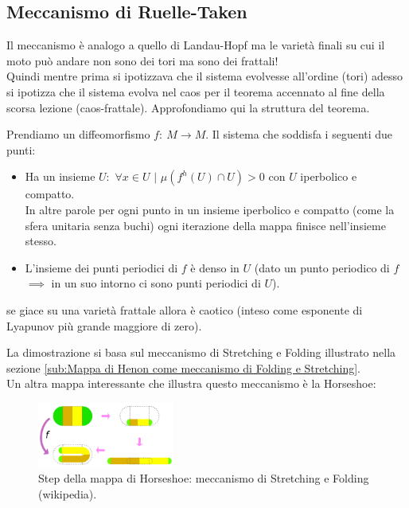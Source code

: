 \subsection{Meccanismo di Ruelle-Taken}%
\label{sub:Meccanismo di Ruelle-Taken}
Il meccanismo è analogo a quello di Landau-Hopf ma le varietà finali su cui il moto può andare non sono dei tori ma sono dei frattali!\\
Quindi mentre prima si ipotizzava che il sistema evolvesse all'ordine (tori) adesso si ipotizza che il sistema evolva nel caos per il teorema accennato al fine della scorsa lezione (caos-frattale). Approfondiamo qui la struttura del teorema.
\begin{thm}[Axiom A]
    Prendiamo un diffeomorfismo $f: \ M\to M$. Il sistema che soddisfa i seguenti due punti:
    \begin{itemize}
	\item Ha un insieme $U:$ $\forall x \in U$ $|$ $\mu (f^h(U) \cap U) > 0 $ con $U$ iperbolico e compatto.\\
	    In altre parole per ogni punto in un insieme iperbolico e compatto (come la sfera unitaria senza buchi) ogni iterazione della mappa finisce nell'insieme stesso.
	\item L'insieme dei punti periodici di $f$ è denso in $U$ (dato un punto periodico di $f$ $\implies$ in un suo intorno ci sono punti periodici di $U$).
    \end{itemize}
    se giace su una varietà frattale allora è caotico (inteso come esponente di Lyapunov più grande maggiore di zero).\\
\end{thm}
\noindent
La dimostrazione si basa sul meccanismo di Stretching e Folding illustrato nella sezione \ref{sub:Mappa di Henon come meccanismo di Folding e Stretching}. \\
Un altra mappa interessante che illustra questo meccanismo è la Horseshoe:
\begin{figure}[H]
    \centering
    \includegraphics[width=0.4\textwidth]{figures/horseshoe.png}
    \caption{\scriptsize Step della mappa di Horseshoe: meccanismo di Stretching e Folding (wikipedia).}
    \label{fig:figures-horseshoe-png}
\end{figure}
